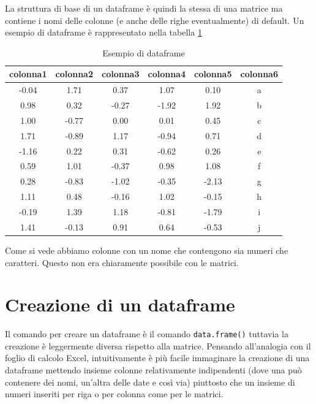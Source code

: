 \documentclass[
]{book}
\begin{document}
La struttura di base di un dataframe è quindi la stessa di una matrice ma contiene i nomi delle colonne (e anche delle righe eventualmente) di default. Un esempio di dataframe è rappresentato nella tabella \ref{tab:ex-dataframe}

\begin{table}

\caption{\label{tab:ex-dataframe}Esempio di dataframe}
\centering
\begin{tabular}[t]{c|c|c|c|c|c}
\hline
colonna1 & colonna2 & colonna3 & colonna4 & colonna5 & colonna6\\
\hline
-0.04 & 1.71 & 0.37 & 1.07 & 0.10 & a\\
\hline
0.98 & 0.32 & -0.27 & -1.92 & 1.92 & b\\
\hline
1.00 & -0.77 & 0.00 & 0.01 & 0.45 & c\\
\hline
1.71 & -0.89 & 1.17 & -0.94 & 0.71 & d\\
\hline
-1.16 & 0.22 & 0.31 & -0.62 & 0.26 & e\\
\hline
0.59 & 1.01 & -0.37 & 0.98 & 1.08 & f\\
\hline
0.28 & -0.83 & -1.02 & -0.35 & -2.13 & g\\
\hline
1.11 & 0.48 & -0.16 & 1.02 & -0.15 & h\\
\hline
-0.19 & 1.39 & 1.18 & -0.81 & -1.79 & i\\
\hline
1.41 & -0.13 & 0.91 & 0.64 & -0.53 & j\\
\hline
\end{tabular}
\end{table}

Come si vede abbiamo colonne con un nome che contengono sia numeri che caratteri. Questo non era chiaramente possibile con le matrici.

\hypertarget{creazione-di-un-dataframe}{%
\section{Creazione di un dataframe}\label{creazione-di-un-dataframe}}

Il comando per creare un dataframe è il comando \texttt{data.frame()} tuttavia la creazione è leggermente diversa rispetto alla matrice. Pensando all'analogia con il foglio di calcolo Excel, intuitivamente è più facile immaginare la creazione di una dataframe mettendo insieme colonne relativamente indipendenti (dove una può contenere dei nomi, un'altra delle date e così via) piuttosto che un insieme di numeri inseriti per riga o per colonna come per le matrici.
\end{document}
